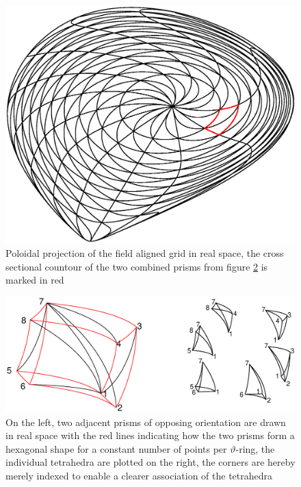 \documentclass[./main.tex]{subfiles}
\begin{document}
\begin{figure}[!ht]
	\includegraphics[width=1.0\textwidth]{figures/Curvilinear_grid.eps}
	\caption{Poloidal projection of the field aligned grid in real space, the cross sectional countour of the two combined prisms from figure \ref{fig:Curvilinear_grid_and_tetrahedra} is marked in red}
	\label{fig:Curvilinear_grid}
\end{figure}
\begin{figure}[!ht]
	\includegraphics[width=1.0\textwidth]{figures/Curvilinear_grid_prisms_tetra.eps}
	\caption{On the left, two adjacent prisms of opposing orientation are drawn in real space with the red lines indicating how the two prisms form a hexagonal shape for a constant number of points per $\vartheta$-ring, the individual tetrahedra are plotted on the right, the corners are hereby merely indexed to enable a clearer association of the tetrahedra}
	\label{fig:Curvilinear_grid_and_tetrahedra}
\end{figure}
\end{document}

